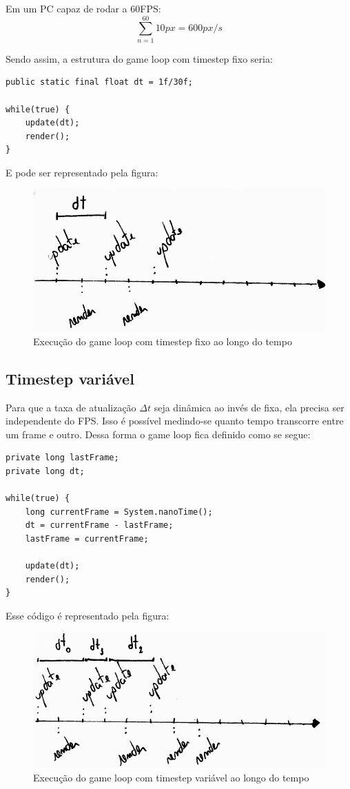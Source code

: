 \documentclass[12pt, 
openright, 
oneside, 
a4paper,    
brazil]{facom-ufu-abntex2}
\begin{document}
\noindent
Em um PC capaz de rodar a 60FPS: $$\sum_{n=1}^{60} 10px = 600 px/s$$

\noindent
Sendo assim, a estrutura do game loop com timestep fixo seria:
\begin{lstlisting}[caption=Game Loop com timestep fixo]
public static final float dt = 1f/30f;

while(true) {
	update(dt);
	render();
}
\end{lstlisting}
E pode ser representado pela figura:
\begin{figure}[H]
	\centering
	\includegraphics[width=\textwidth]{imagens/ilu2_small.png}
	\caption{Execução do game loop com timestep fixo ao longo do tempo}
\end{figure}

\subsection{Timestep variável}
Para que a taxa de atualização $\Delta t$ seja dinâmica ao invés de fixa, ela precisa ser independente do FPS. Isso é possível medindo-se quanto tempo transcorre entre um frame e outro. Dessa forma o game loop fica definido como se segue:

\begin{lstlisting}[caption=Game loop com timestep variável]
private long lastFrame;
private long dt;
		
while(true) {
	long currentFrame = System.nanoTime(); 
	dt = currentFrame - lastFrame;
	lastFrame = currentFrame;
	
	update(dt);
	render();
}
\end{lstlisting}
Esse código é representado pela figura:
\begin{figure}[H]
	\centering
	\includegraphics[width=\textwidth]{imagens/ilu3_small.png}
	\caption{Execução do game loop com timestep variável ao longo do tempo}
\end{figure}
\end{document}
